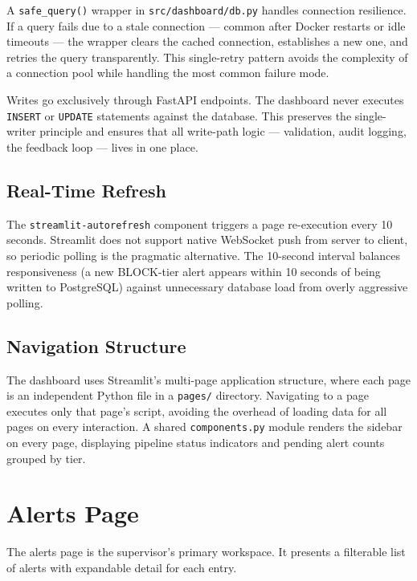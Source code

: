 A \texttt{safe\_query()} wrapper in \texttt{src/dashboard/db.py} handles
connection resilience. If a query fails due to a stale connection --- common
after Docker restarts or idle timeouts --- the wrapper clears the cached
connection, establishes a new one, and retries the query transparently. This
single-retry pattern avoids the complexity of a connection pool while
handling the most common failure mode.

Writes go exclusively through FastAPI endpoints. The dashboard never
executes \texttt{INSERT} or \texttt{UPDATE} statements against the database.
This preserves the single-writer principle and ensures that all write-path
logic --- validation, audit logging, the feedback loop --- lives in one
place.

\subsection{Real-Time Refresh}

The \texttt{streamlit-autorefresh} component triggers a page re-execution
every 10 seconds. Streamlit does not support native WebSocket push from
server to client, so periodic polling is the pragmatic alternative. The
10-second interval balances responsiveness (a new BLOCK-tier alert appears
within 10 seconds of being written to PostgreSQL) against unnecessary
database load from overly aggressive polling.

\subsection{Navigation Structure}

The dashboard uses Streamlit's multi-page application structure, where each
page is an independent Python file in a \texttt{pages/} directory. Navigating
to a page executes only that page's script, avoiding the overhead of loading
data for all pages on every interaction. A shared \texttt{components.py}
module renders the sidebar on every page, displaying pipeline status
indicators and pending alert counts grouped by tier.


\section{Alerts Page}
\label{sec:dashboard-alerts}

The alerts page is the supervisor's primary workspace. It presents a
filterable list of alerts with expandable detail for each entry.

